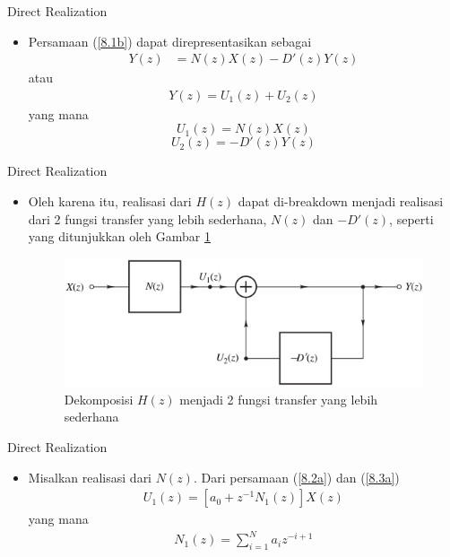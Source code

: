 \documentclass[pdflatex,compress,mathserif]{beamer}
\begin{document}
\begin{frame}{Direct Realization}
	\begin{itemize}
		\item Persamaan (\ref{8.1b}) dapat direpresentasikan sebagai
		\begin{align*}
			Y(z) &= N(z)X(z) - D'(z)Y(z)
		\end{align*}
		atau
		\begin{align*}
			Y(z) = U_1(z)+U_2(z)
		\end{align*}
		yang mana
		\begin{equation}\label{8.3a}
			U_1(z) = N(z)X(z)
		\end{equation}
		\begin{equation}\label{8.3b}
			U_2(z) = -D'(z)Y(z)
		\end{equation}
	\end{itemize}
\end{frame}

\begin{frame}{Direct Realization}
	\begin{itemize}
		\item Oleh karena itu, realisasi dari $ H(z) $ dapat di-breakdown menjadi realisasi dari 2 fungsi transfer yang lebih sederhana, $ N(z) $ dan $ -D'(z) $, seperti yang ditunjukkan oleh Gambar \ref{fig:8.1}
		\begin{figure}
			\centering
			\includegraphics[width=\linewidth]{img/img01}
			\caption{Dekomposisi $ H(z) $ menjadi 2 fungsi transfer yang lebih sederhana}
			\label{fig:8.1}
		\end{figure}
		
	\end{itemize}
\end{frame}

\begin{frame}{Direct Realization}
	\begin{itemize}
		\item Misalkan realisasi dari $ N(z) $. Dari persamaan (\ref{8.2a}) dan (\ref{8.3a})
		\begin{align*}
			U_1(z) = \left[ a_0 + z^{-1} N_1(z) \right] X(z)
		\end{align*}
		yang mana
		\begin{align*}
			N_1(z) = \sum\limits_{i = 1}^{N}a_i z^{-i+1}
		\end{align*}
	\end{itemize}
\end{frame}
\end{document}
